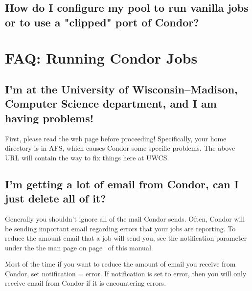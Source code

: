 \Todo

\subsection{How do I configure my pool to run vanilla jobs or to use a "clipped" port of Condor?}

\Todo

\section{FAQ: Running Condor Jobs}


\subsection{I'm at the University of Wisconsin--Madison, Computer Science department, and I am having problems!}

First, please read the web page  before proceeding!
Specifically, your home directory is in AFS, which causes Condor some specific problems.
The above URL will contain the way to fix things here at UWCS.

\subsection{I'm getting a lot of email from Condor, can I just delete all of it?}

Generally you shouldn't ignore all of the mail Condor sends.  Often,
Condor will be sending important email regarding errors that your
jobs are reporting.  To reduce the amount email that a job will send
you, see the notification parameter under the the  man page
on page~\pageref{man-condor-submit-notification} of this manual.

Most of the time if you want to reduce the amount of email you receive
from Condor, set notification = error.  If notification is set to
error, then you will only receive email from Condor if it is encountering
errors.

